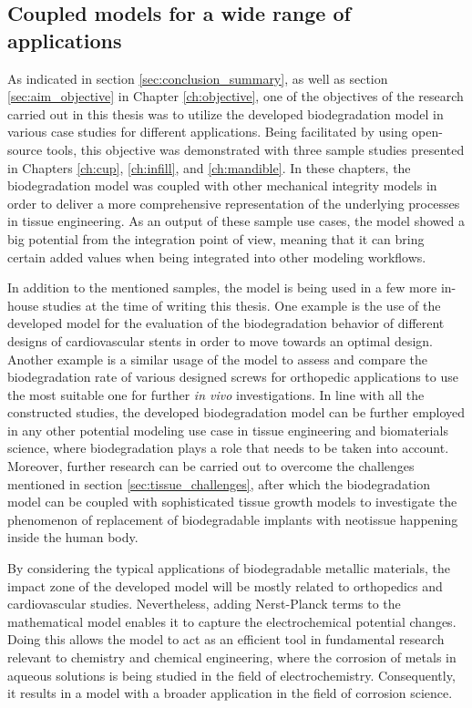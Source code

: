 \subsection{Coupled models for a wide range of applications}

As indicated in section \ref{sec:conclusion_summary}, as well as section \ref{sec:aim_objective} in Chapter \ref{ch:objective}, one of the objectives of the research carried out in this thesis was to utilize the developed biodegradation model in various case studies for different applications. Being facilitated by using open-source tools, this objective was demonstrated with three sample studies presented in Chapters \ref{ch:cup}, \ref{ch:infill}, and \ref{ch:mandible}. In these chapters, the biodegradation model was coupled with other mechanical integrity models in order to deliver a more comprehensive representation of the underlying processes in tissue engineering. As an output of these sample use cases, the model showed a big potential from the integration point of view, meaning that it can bring certain added values when being integrated into other modeling workflows.

In addition to the mentioned samples, the model is being used in a few more in-house studies at the time of writing this thesis. One example is the use of the developed model for the evaluation of the biodegradation behavior of different designs of cardiovascular stents in order to move towards an optimal design. Another example is a similar usage of the model to assess and compare the biodegradation rate of various designed screws for orthopedic applications to use the most suitable one for further \textit{in vivo} investigations. In line with all the constructed studies, the developed biodegradation model can be further employed in any other potential modeling use case in tissue engineering and biomaterials science, where biodegradation plays a role that needs to be taken into account. Moreover, further research can be carried out to overcome the challenges mentioned in section \ref{sec:tissue_challenges}, after which the biodegradation model can be coupled with sophisticated tissue growth models to investigate the phenomenon of replacement of biodegradable implants with neotissue happening inside the human body.

By considering the typical applications of biodegradable metallic materials, the impact zone of the developed model will be mostly related to orthopedics and cardiovascular studies. Nevertheless, adding Nerst-Planck terms to the mathematical model enables it to capture the electrochemical potential changes. Doing this allows the model to act as an efficient tool in fundamental research relevant to chemistry and chemical engineering, where the corrosion of metals in aqueous solutions is being studied in the field of electrochemistry. Consequently, it results in a model with a broader application in the field of corrosion science.





\cleardoublepage

